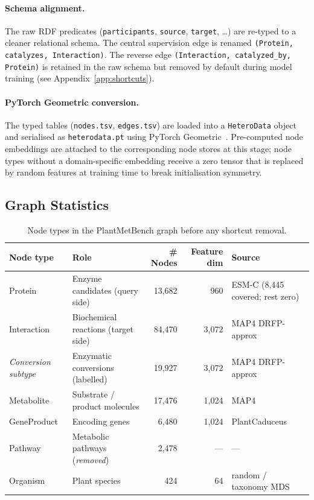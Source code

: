 \paragraph{Schema alignment.}
The raw RDF predicates (\texttt{participants}, \texttt{source}, \texttt{target}, \ldots)
are re-typed to a cleaner relational schema.
The central supervision edge is renamed
\texttt{(Protein, catalyzes, Interaction)}.
The reverse edge \texttt{(Interaction, catalyzed\_by, Protein)} is retained in the
raw schema but removed by default during model training (see Appendix~\ref{app:shortcuts}).

\paragraph{PyTorch Geometric conversion.}
The typed tables (\texttt{nodes.tsv}, \texttt{edges.tsv}) are loaded into a
\texttt{HeteroData} object and serialised as \texttt{heterodata.pt} using
PyTorch Geometric~\cite{Fey/Lenssen/2019}.
Pre-computed node embeddings are attached to the corresponding node stores at
this stage; node types without a domain-specific embedding receive a zero tensor
that is replaced by random features at training time to break initialisation symmetry.

\subsection{Graph Statistics}

\begin{table}[h]
\centering
\caption{Node types in the PlantMetBench graph before any shortcut removal.}
\label{tab:node_types}
\begin{tabular}{llrrl}
\toprule
Node type & Role & \# Nodes & Feature dim & Source \\
\midrule
Protein        & Enzyme candidates (query side)          & 13,682  & 960   & ESM-C (8,445 covered; rest zero) \\
Interaction    & Biochemical reactions (target side)     & 84,470  & 3,072 & MAP4 DRFP-approx \\
\quad\emph{Conversion subtype} & Enzymatic conversions (labelled) & 19,927 & 3,072 & MAP4 DRFP-approx \\
Metabolite     & Substrate / product molecules           & 17,476  & 1,024 & MAP4 \\
GeneProduct    & Encoding genes                          & 6,480   & 1,024 & PlantCaduceus \\
Pathway        & Metabolic pathways (\emph{removed})     & 2,478   & —     & — \\
Organism       & Plant species                           & 424     & 64    & random / taxonomy MDS \\
\bottomrule
\end{tabular}
\end{table}

